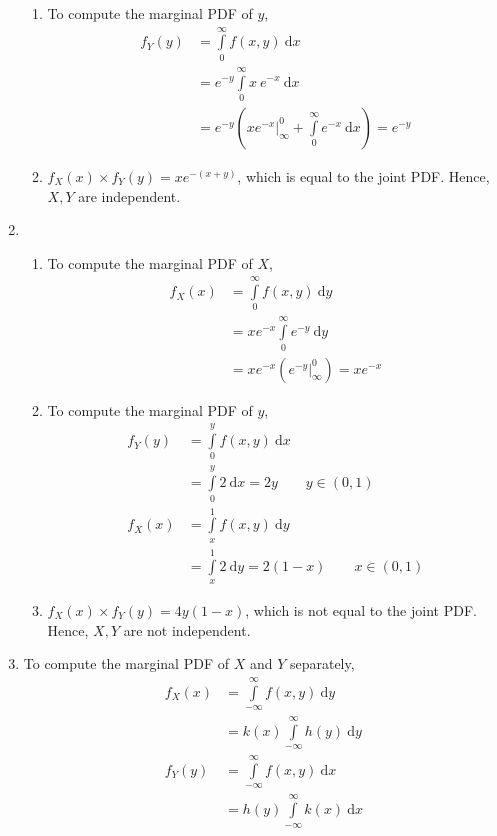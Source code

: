 \begin{enumerate}
\begin{enumerate}
			\item To compute the marginal PDF of $ y $, 
			\begin{align}
				f_Y (y) &= \int\limits_{0}^{\infty} f(x, y)\ \mathrm{d}x \nonumber \\
				&= e^{-y} \int\limits_{0}^{\infty} x\ e^{-x}\ \mathrm{d}x \nonumber \\
				&= e^{-y} \left(xe^{-x}\Big|_\infty^0 + \int\limits_{0}^{\infty} e^{-x} \ \mathrm{d}x\right) = e^{-y}
			\end{align}
			
			\item $ f_X (x) \times f_Y (y)  = x e^{-(x + y)}$, which is equal to the joint PDF. Hence, $ X, Y $ are independent.
		\end{enumerate}
	
	
	\item 
		\begin{enumerate}
			\item To compute the marginal PDF of $ X $, 
			\begin{align}
				f_X (x) &= \int\limits_{0}^{\infty} f(x, y)\ \mathrm{d}y \nonumber \\
				&= x e^{-x} \int\limits_{0}^{\infty} e^{-y}\ \mathrm{d}y \nonumber \\
				&= x e^{-x} \left(e^{-y}\Big|_\infty^0\right) = x e^{-x}
			\end{align}
			
			\item To compute the marginal PDF of $ y $, 
			\begin{align}
				f_Y (y) &= \int\limits_{0}^{y} f(x, y)\ \mathrm{d}x \nonumber \\
				&= \int\limits_{0}^{y} 2\ \mathrm{d}x = 2y  \qquad y \in (0, 1) \\
				f_X (x) &= \int\limits_{x}^{1} f(x, y)\ \mathrm{d}y \nonumber \\
				&= \int\limits_{x}^{1} 2\ \mathrm{d}y  = 2(1 - x)  \qquad x \in (0, 1)
			\end{align}
			
			\item $ f_X (x) \times f_Y (y)  = 4y(1-x)$, which is not equal to the joint PDF. Hence, $ X, Y $ are not independent.
		\end{enumerate}
	
	
	\item  
		To compute the marginal PDF of $ X $ and $ Y $ separately, 
		\begin{align}
			f_X (x) &= \int\limits_{-\infty}^{\infty} f(x, y)\ \mathrm{d}y \nonumber \\
			&= k(x) \int\limits_{-\infty}^{\infty} h(y)\ \mathrm{d}y \\
			f_Y (y) &= \int\limits_{-\infty}^{\infty} f(x, y)\ \mathrm{d}x \nonumber \\
			&= h(y) \int\limits_{-\infty}^{\infty} k(x)\ \mathrm{d}x
		\end{align}
		

\end{enumerate}
